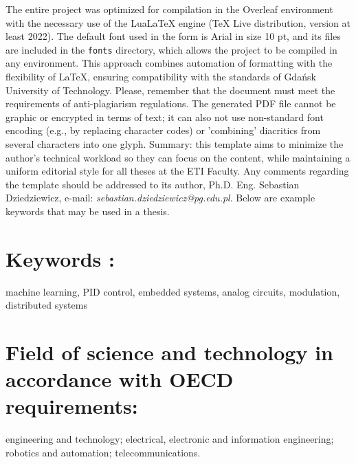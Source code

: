 The entire project was optimized for compilation in the Overleaf environment with the necessary use of the LuaLaTeX engine (TeX Live distribution, version at least 2022). The default font used in the form is Arial in size 10 pt, and its files are included in the \texttt{fonts} directory, which allows the project to be compiled in any environment. This approach combines automation of formatting with the flexibility of \LaTeX{}, ensuring compatibility with the standards of Gdańsk University of Technology. Please, remember that the document must meet the requirements of anti-plagiarism regulations. The generated PDF file cannot be graphic or encrypted in terms of text; it can also not use non-standard font encoding (e.g., by replacing character codes) or 'combining' diacritics from several characters into one glyph. Summary: this template aims to minimize the author's technical workload so they can focus on the content, while maintaining a uniform editorial style for all theses at the ETI Faculty. Any comments regarding the template should be addressed to its author, Ph.D. Eng. Sebastian Dziedziewicz, e-mail: \textit{sebastian.dziedziewicz@pg.edu.pl}. Below are example keywords that may be used in a thesis.

\section*{Keywords :}
\noindent machine learning, PID control, embedded systems, analog circuits, modulation, distributed systems
\section*{Field of science and technology in accordance with OECD requirements:}
\noindent engineering and technology; electrical, electronic and information engineering; robotics and automation; telecommunications.